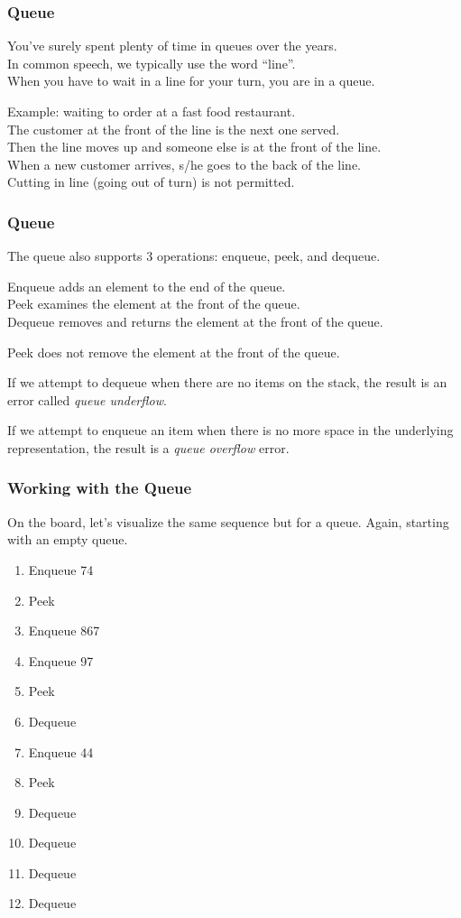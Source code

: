 \begin{frame}
\frametitle{Queue}

You've surely spent plenty of time in queues over the years.\\
\quad In common speech, we typically use the word ``line''.\\
\quad When you have to wait in a line for your turn, you are in a queue.


Example: waiting to order at a fast food restaurant.\\

\quad The customer at the front of the line is the next one served.\\
\quad Then the line moves up and someone else is at the front of the line.\\
\quad When a new customer arrives, s/he goes to the back of the line.\\
\quad Cutting in line (going out of turn) is not permitted.

\end{frame}


\begin{frame}
\frametitle{Queue}

The queue also supports 3 operations: \alert{enqueue}, \alert{peek}, and \alert{dequeue}.

Enqueue adds an element to the end of the queue.\\
Peek examines the element at the front of the queue.\\
Dequeue removes and returns the element at the front of the queue.

Peek does not remove the element at the front of the queue.

If we attempt to dequeue when there are no items on the stack, the result is an error called \textit{queue underflow}.

If we attempt to enqueue an item when there is no more space in the underlying representation, the result is a \textit{queue overflow} error.

\end{frame}

\begin{frame}
\frametitle{Working with the Queue}
On the board, let's visualize the same sequence but for a queue. Again, starting with an empty queue.

\begin{enumerate}
	\item Enqueue 74
	\item Peek
	\item Enqueue 867
	\item Enqueue 97
	\item Peek
	\item Dequeue
	\item Enqueue 44
	\item Peek
	\item Dequeue
	\item Dequeue
	\item Dequeue
	\item Dequeue
\end{enumerate}


\end{frame}


